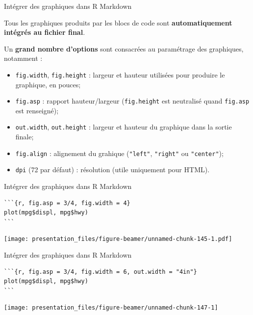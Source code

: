 \documentclass[12pt,handout,ignorenonframetext,]{beamer}
\providecommand{\tightlist}{%
\setlength{\itemsep}{0pt}\setlength{\parskip}{0pt}}
\begin{document}
\begin{frame}[fragile]{Intégrer des graphiques dans R Markdown}

Tous les graphiques produits par les blocs de code sont
\textbf{automatiquement intégrés au fichier final}.

\pause Un \textbf{grand nombre d'options} sont consacrées au paramétrage
des graphiques, notamment :

\begin{itemize}
\tightlist
\item
  \texttt{fig.width}, \texttt{fig.height} : largeur et hauteur utilisées
  pour produire le graphique, en pouces;
\item
  \texttt{fig.asp} : rapport hauteur/largeur (\texttt{fig.height} est
  neutralisé quand \texttt{fig.asp} est renseigné);
\item
  \texttt{out.width}, \texttt{out.height} : largeur et hauteur du
  graphique dans la sortie finale;
\item
  \texttt{fig.align} : alignement du grahique (\texttt{"left"},
  \texttt{"right"} ou \texttt{"center"});
\item
  \texttt{dpi} (72 par défaut) : résolution (utile uniquement pour
  HTML).
\end{itemize}

\end{frame}

\begin{frame}[fragile]{Intégrer des graphiques dans R Markdown}

\footnotesize \center

\begin{verbatim}
```{r, fig.asp = 3/4, fig.width = 4}
plot(mpg$displ, mpg$hwy)
```
\end{verbatim}

\texttt{[image: presentation\_files/figure-beamer/unnamed-chunk-145-1.pdf]}

\end{frame}

\begin{frame}[fragile]{Intégrer des graphiques dans R Markdown}

\footnotesize \center

\begin{verbatim}
```{r, fig.asp = 3/4, fig.width = 6, out.width = "4in"}
plot(mpg$displ, mpg$hwy)
```
\end{verbatim}

\texttt{[image: presentation\_files/figure-beamer/unnamed-chunk-147-1]}

\end{frame}
\end{document}
